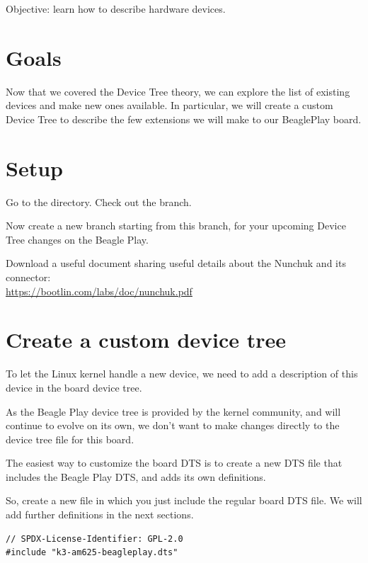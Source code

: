 {Objective: learn how to describe hardware devices.}

\section{Goals}

Now that we covered the Device Tree theory, we can explore the list of
existing devices and make new ones available. In particular, we will
create a custom Device Tree to describe the few extensions we will make
to our BeaglePlay board.

\section{Setup}

Go to the  directory. Check out the
 branch.

Now create a new  branch starting from this branch,
for your upcoming Device Tree changes on the Beagle Play.

Download a useful document sharing useful details about the Nunchuk
and its connector:\\
\url{https://bootlin.com/labs/doc/nunchuk.pdf}

\section{Create a custom device tree}

To let the Linux kernel handle a new device, we need to add a
description of this device in the board device tree.

As the Beagle Play device tree is provided by the kernel community,
and will continue to evolve on its own, we don't want to make changes
directly to the device tree file for this board.

The easiest way to customize the board DTS is to create a new DTS file
that includes the Beagle Play DTS, and adds its own definitions.

So, create a new
 file in which
you just include the regular board DTS file. We will add further
definitions in the next sections.

\begin{verbatim}
// SPDX-License-Identifier: GPL-2.0
#include "k3-am625-beagleplay.dts"
\end{verbatim}

